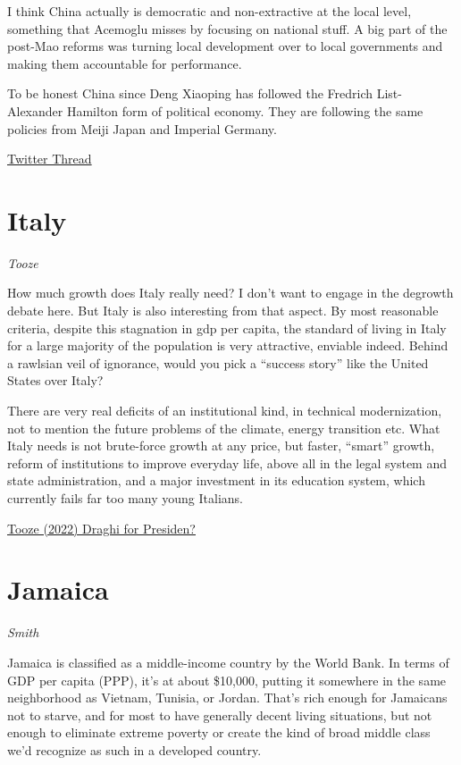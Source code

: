 \documentclass[
]{book}
\begin{document}
I think China actually is democratic and non-extractive at the local level, something that Acemoglu misses by focusing on national stuff. A big part of the post-Mao reforms was turning local development over to local governments and making them accountable for performance.

To be honest China since Deng Xiaoping has followed the Fredrich List- Alexander Hamilton form of political economy. They are following the same policies from Meiji Japan and Imperial Germany.

\href{https://twitter.com/RichardHanania/status/1403124768560205825}{Twitter Thread}

\hypertarget{italy}{%
\section{Italy}\label{italy}}

\emph{Tooze}

How much growth does Italy really need? I don't want to engage in the degrowth debate here. But Italy is also interesting from that aspect. By most reasonable criteria, despite this stagnation in gdp per capita, the standard of living in Italy for a large majority of the population is very attractive, enviable indeed. Behind a rawlsian veil of ignorance, would you pick a ``success story'' like the United States over Italy?

There are very real deficits of an institutional kind, in technical modernization, not to mention the future problems of the climate, energy transition etc. What Italy needs is not brute-force growth at any price, but faster, ``smart'' growth, reform of institutions to improve everyday life, above all in the legal system and state administration, and a major investment in its education system, which currently fails far too many young Italians.

\href{https://adamtooze.substack.com/p/chartbook-70-draghi-for-president}{Tooze (2022) Draghi for Presiden?}

\hypertarget{jamaica}{%
\section{Jamaica}\label{jamaica}}

\emph{Smith}

Jamaica is classified as a middle-income country by the World Bank. In terms of GDP per capita (PPP), it's at about \$10,000, putting it somewhere in the same neighborhood as Vietnam, Tunisia, or Jordan. That's rich enough for Jamaicans not to starve, and for most to have generally decent living situations, but not enough to eliminate extreme poverty or create the kind of broad middle class we'd recognize as such in a developed country.
\end{document}
